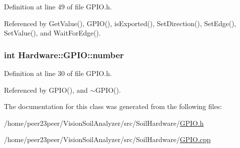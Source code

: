 Definition at line 49 of file G\+P\+I\+O.\+h.



Referenced by Get\+Value(), G\+P\+I\+O(), is\+Exported(), Set\+Direction(), Set\+Edge(), Set\+Value(), and Wait\+For\+Edge().

\hypertarget{class_hardware_1_1_g_p_i_o_a1671a87bb70911b0a6a29019a068cf96}{}
\subsubsection[{number}]{\setlength{\rightskip}{0pt plus 5cm}int Hardware\+::\+G\+P\+I\+O\+::number}\label{class_hardware_1_1_g_p_i_o_a1671a87bb70911b0a6a29019a068cf96}


Definition at line 30 of file G\+P\+I\+O.\+h.



Referenced by G\+P\+I\+O(), and $\sim$\+G\+P\+I\+O().



The documentation for this class was generated from the following files\+:\begin{DoxyCompactItemize}
\item 
/home/peer23peer/\+Vision\+Soil\+Analyzer/src/\+Soil\+Hardware/\hyperlink{_g_p_i_o_8h}{G\+P\+I\+O.\+h}\item 
/home/peer23peer/\+Vision\+Soil\+Analyzer/src/\+Soil\+Hardware/\hyperlink{_g_p_i_o_8cpp}{G\+P\+I\+O.\+cpp}\end{DoxyCompactItemize}
